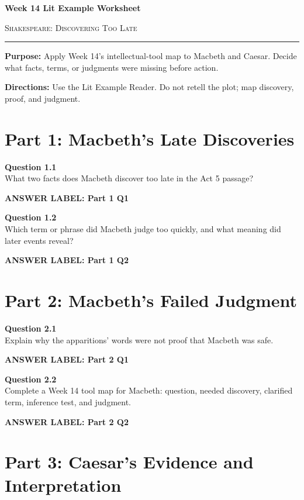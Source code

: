 \documentclass[12pt]{article}
\newcommand{\answerbox}[2]{%
\vspace{0.12em}
\noindent\textbf{#1}\par
\vspace{0.04em}
\noindent\fbox{%
\begin{minipage}[t][#2]{\dimexpr\textwidth-2\fboxsep-2\fboxrule}
\rule{\textwidth}{0pt}
\vspace{#2}
\end{minipage}}
\par\vspace{0.22em}}
\begin{document}
\begin{center}
{\LARGE\bfseries Week 14 Lit Example Worksheet}\par\vspace{0.05em}
{\large\scshape Shakespeare: Discovering Too Late}\par\vspace{0.12em}
\rule{0.78\textwidth}{0.5pt}
\end{center}

\textbf{Purpose:} Apply Week 14's intellectual-tool map to Macbeth and Caesar. Decide what facts, terms, or judgments were missing before action.

\textbf{Directions:} Use the Lit Example Reader. Do not retell the plot; map discovery, proof, and judgment.

\section*{Part 1: Macbeth's Late Discoveries}

\textbf{Question 1.1}\\[-0.15em]
What two facts does Macbeth discover too late in the Act 5 passage?

\answerbox{ANSWER LABEL: Part 1 Q1}{2.0in}

\textbf{Question 1.2}\\[-0.15em]
Which term or phrase did Macbeth judge too quickly, and what meaning did later events reveal?

\answerbox{ANSWER LABEL: Part 1 Q2}{2.15in}

\newpage

\section*{Part 2: Macbeth's Failed Judgment}

\textbf{Question 2.1}\\[-0.15em]
Explain why the apparitions' words were not proof that Macbeth was safe.

\answerbox{ANSWER LABEL: Part 2 Q1}{2.3in}

\textbf{Question 2.2}\\[-0.15em]
Complete a Week 14 tool map for Macbeth: question, needed discovery, clarified term, inference test, and judgment.

\answerbox{ANSWER LABEL: Part 2 Q2}{2.55in}

\newpage

\section*{Part 3: Caesar's Evidence and Interpretation}
\end{document}
